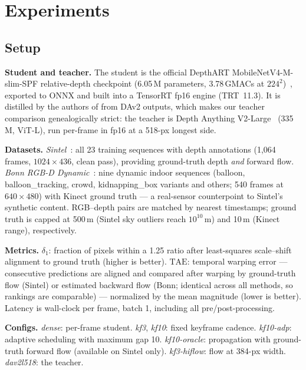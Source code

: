 \documentclass[10pt,twocolumn]{article}
\begin{document}
\section{Experiments}
\label{sec:exp}

\subsection{Setup}
\textbf{Student and teacher.} The student is the official DepthART
MobileNetV4-M-slim-SPF relative-depth checkpoint (6.05\,M parameters,
3.78\,GMACs at $224^2$)~\cite{depthart}, exported to ONNX and built into a
TensorRT fp16 engine (TRT~11.3). It is distilled by the authors of
\cite{depthart} from DAv2 outputs, which makes our teacher comparison
genealogically strict: the teacher is Depth Anything V2-Large~\cite{dav2}
(335\,M, ViT-L), run per-frame in fp16 at a 518-px longest side.

\textbf{Datasets.} \emph{Sintel}~\cite{sintel}: all 23 training sequences with
depth annotations (1{,}064 frames, $1024{\times}436$, clean pass), providing
ground-truth depth \emph{and} forward flow. \emph{Bonn RGB-D
Dynamic}~\cite{bonn}: nine dynamic indoor sequences (balloon,
balloon\_tracking, crowd, kidnapping\_box variants and others; 540 frames
at $640{\times}480$) with Kinect ground truth ---
a real-sensor counterpoint to Sintel's synthetic content. RGB--depth pairs are
matched by nearest timestamps; ground truth is capped at 500\,m (Sintel sky
outliers reach $10^{10}$\,m) and 10\,m (Kinect range), respectively.

\textbf{Metrics.} $\delta_1$: fraction of pixels within a 1.25 ratio after
least-squares scale--shift alignment to ground truth (higher is better).
$\mathrm{TAE}$: temporal warping error --- consecutive predictions are aligned
and compared after warping by ground-truth flow (Sintel) or estimated
backward flow (Bonn; identical across all methods, so rankings are
comparable) --- normalized by the mean magnitude (lower is better). Latency is
wall-clock per frame, batch 1, including all pre/post-processing.

\textbf{Configs.} \emph{dense}: per-frame student. \emph{kf3}, \emph{kf10}:
fixed keyframe cadence. \emph{kf10-adp}: adaptive scheduling with maximum gap
10. \emph{kf10-oracle}: propagation with ground-truth forward flow
(available on Sintel only). \emph{kf3-hiflow}: flow at 384-px width.
\emph{dav2l518}: the teacher.
\end{document}
